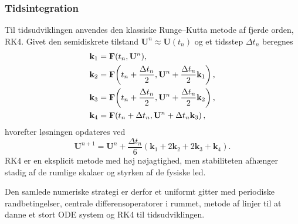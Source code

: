 \subsubsection{Tidsintegration}
Til tidsudviklingen anvendes den klassiske Runge--Kutta metode af fjerde orden, RK4. Givet den semidiskrete tilstand $\mathbf{U}^n \approx \mathbf{U}(t_n)$ og et tidsstep $\Delta t_n$ beregnes
\begin{align}
    \mathbf{k}_1 &= \mathbf{F}(t_n,\mathbf{U}^n), \notag\\
    \mathbf{k}_2 &= \mathbf{F}\!\left(t_n+\frac{\Delta t_n}{2}, \mathbf{U}^n+\frac{\Delta t_n}{2}\mathbf{k}_1\right), \notag\\
    \mathbf{k}_3 &= \mathbf{F}\!\left(t_n+\frac{\Delta t_n}{2}, \mathbf{U}^n+\frac{\Delta t_n}{2}\mathbf{k}_2\right), \notag\\
    \mathbf{k}_4 &= \mathbf{F}\!\left(t_n+\Delta t_n, \mathbf{U}^n+\Delta t_n\mathbf{k}_3\right), \notag
\end{align}
hvorefter løsningen opdateres ved
\begin{equation}
    \mathbf{U}^{n+1}
    =
    \mathbf{U}^n
    +
    \frac{\Delta t_n}{6}
    \left(
        \mathbf{k}_1 + 2\mathbf{k}_2 + 2\mathbf{k}_3 + \mathbf{k}_4
    \right).
    \label{eq:rk4_update}
\end{equation}
RK4 er en eksplicit metode med høj nøjagtighed, men stabiliteten afhænger stadig af de rumlige skalaer og styrken af de fysiske led.

Den samlede numeriske strategi er derfor et uniformt gitter med periodiske randbetingelser, centrale differensoperatorer i rummet, metode af linjer til at danne et stort ODE system og RK4 til tidsudviklingen.
